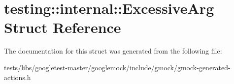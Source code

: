 \hypertarget{structtesting_1_1internal_1_1ExcessiveArg}{}\section{testing\+:\+:internal\+:\+:Excessive\+Arg Struct Reference}
\label{structtesting_1_1internal_1_1ExcessiveArg}


The documentation for this struct was generated from the following file\+:\begin{DoxyCompactItemize}
\item 
tests/libs/googletest-\/master/googlemock/include/gmock/gmock-\/generated-\/actions.\+h\end{DoxyCompactItemize}
